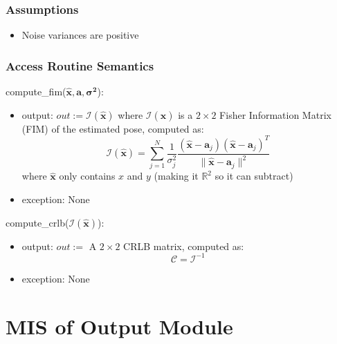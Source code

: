 \documentclass[12pt, titlepage]{article}
\begin{document}
\subsubsection{Assumptions}
\begin{itemize}
  \item Noise variances are positive
\end{itemize}

\subsubsection{Access Routine Semantics}

\noindent compute\_fim($\hat{\mathbf{x}}, \mathbf{a}, \boldsymbol{\sigma^2}$):
\begin{itemize}
\item output: $out:=\boldsymbol{\mathcal{I}}(\hat{\mathbf{x}})$ where $\boldsymbol{\mathcal{I}}(\hat{\mathbf{x}})$ is a \( 2 \times 2 \) Fisher Information Matrix (FIM) of the estimated pose, computed as:
\[
\mathcal{I}(\hat{\mathbf{x}}) = \sum_{j=1}^{N} \frac{1}{\sigma_j^2} \frac{(\hat{\mathbf{x}} - \mathbf{a}_j)(\hat{\mathbf{x}} - \mathbf{a}_j)^T}{\|\hat{\mathbf{x}} - \mathbf{a}_j\|^2}
\]
where $\mathbf{\hat{x}}$ only contains $x$ and $y$ (making it $\mathbb{R}^2$ so it can subtract)
\item exception: None
\end{itemize}

\noindent compute\_crlb($\boldsymbol{\mathcal{I}}(\hat{\mathbf{x}})$):
\begin{itemize}
\item output: $out:=$ A \( 2 \times 2 \) CRLB matrix, computed as:
\[
\boldsymbol{\mathcal{C}} = \boldsymbol{\mathcal{I}}^{-1}
\]
\item exception: None
\end{itemize}


\newpage

\section{MIS of Output Module} \label{M_Output} 
\end{document}

